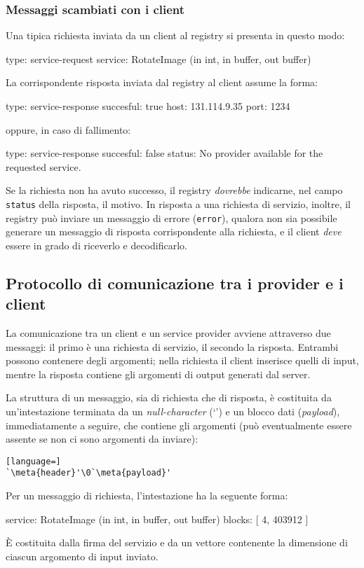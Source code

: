 \documentclass[a4paper,twoside]{article}
\newcommand*\meta[1]{$\langle$\emph{#1}$\rangle$}
\newcommand\code{\lstinline[basicstyle=\normalsize\ttfamily]}
\begin{document}
\subsubsection{Messaggi scambiati con i client}

Una tipica richiesta inviata da un client al registry si presenta in questo modo:
\begin{yaml}
type: service-request
service: RotateImage (in int, in buffer, out buffer)
\end{yaml}
La corrispondente risposta inviata dal registry al client assume la forma:
\begin{yaml}
type: service-response
succesful: true
host: 131.114.9.35
port: 1234
\end{yaml}
oppure, in caso di fallimento:
\begin{yaml}
type: service-response
succesful: false
status: No provider available for the requested service.
\end{yaml}
Se la richiesta non ha avuto successo, il registry \emph{dovrebbe} indicarne, nel campo \code|status| della risposta, il motivo. In risposta a una richiesta di servizio, inoltre, il registry può inviare un messaggio di errore (\code|error|), qualora non sia possibile generare un messaggio di risposta corrispondente alla richiesta, e il client \emph{deve} essere in grado di riceverlo e decodificarlo.


\subsection{Protocollo di comunicazione tra i provider e i client}

La comunicazione tra un client e un service provider avviene attraverso due messaggi: il primo è una richiesta di servizio, il secondo la risposta. Entrambi possono contenere degli argomenti; nella richiesta il client inserisce quelli di input, mentre la risposta contiene gli argomenti di output generati dal server.

La struttura di un messaggio, sia di richiesta che di risposta, è costituita da un'intestazione terminata da un \emph{null-character} (`\string\0') e un blocco dati (\emph{payload}), immediatamente a seguire, che contiene gli argomenti (può eventualmente essere assente se non ci sono argomenti da inviare):
\begin{lstlisting}[language=]
`\meta{header}'\0`\meta{payload}'
\end{lstlisting}

Per un messaggio di richiesta, l'intestazione ha la seguente forma:
\begin{yaml}
service: RotateImage (in int, in buffer, out buffer)
blocks: [ 4, 403912 ]
\end{yaml}
È costituita dalla firma del servizio e da un vettore contenente la dimensione di ciascun argomento di input inviato.
\end{document}
